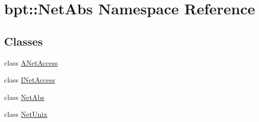 \hypertarget{namespacebpt_1_1_net_abs}{\section{bpt\-:\-:Net\-Abs Namespace Reference}
\label{namespacebpt_1_1_net_abs}
}
\subsection*{Classes}
\begin{DoxyCompactItemize}
\item 
class \hyperlink{classbpt_1_1_net_abs_1_1_a_net_access}{A\-Net\-Access}
\item 
class \hyperlink{classbpt_1_1_net_abs_1_1_i_net_access}{I\-Net\-Access}
\item 
class \hyperlink{classbpt_1_1_net_abs_1_1_net_abs}{Net\-Abs}
\item 
class \hyperlink{classbpt_1_1_net_abs_1_1_net_unix}{Net\-Unix}
\end{DoxyCompactItemize}
